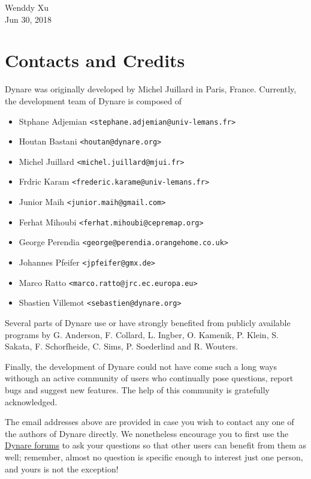 \documentclass[10pt,math=newtx,citestyle=gb7714-2015,bibstyle=gb7714-2015]{elegantbook}
\begin{document}
	
	
	\vskip 1.5cm
	
	\begin{flushright}
		Wenddy Xu\\
		Jun 30, 2018
	\end{flushright}

\chapter*{Contacts and Credits} 
Dynare was originally developed by Michel Juillard in Paris, France. Currently, the development team of Dynare is composed of

\begin{itemize}
	\item Stphane Adjemian \texttt{<stephane.adjemian@univ-lemans.fr>}
	\item Houtan Bastani \texttt{<houtan@dynare.org>}
	\item Michel Juillard \texttt{<michel.juillard@mjui.fr>}
	\item Frdric Karam \texttt{<frederic.karame@univ-lemans.fr>}
	\item Junior Maih \texttt{<junior.maih@gmail.com>}
	\item Ferhat Mihoubi \texttt{<ferhat.mihoubi@cepremap.org>}
	\item George Perendia \texttt{<george@perendia.orangehome.co.uk>}
	\item Johannes Pfeifer \texttt{<jpfeifer@gmx.de>}
	\item Marco Ratto \texttt{<marco.ratto@jrc.ec.europa.eu>}
	\item Sbastien Villemot \texttt{<sebastien@dynare.org>}
\end{itemize}

Several parts of Dynare use or have strongly benefited from publicly available programs by G. Anderson, F. Collard, L. Ingber, O. Kamenik, P. Klein, S. Sakata, F. Schorfheide, C. Sims, P. Soederlind and R. Wouters.

Finally, the development of Dynare could not have come such a long ways withough an active community of users who continually pose questions, report bugs and suggest new features. The help of this community is gratefully acknowledged.

The email addresses above are provided in case you wish to contact any one of the authors of Dynare directly. We nonetheless encourage you to first use the \href{http://forum.dynare.org/}{Dynare forums} to ask your questions so that other users can benefit from them as well; remember, almost no question is specific enough to interest just one person, and yours is not the exception!
	
\end{document}
